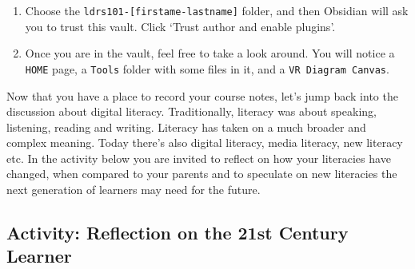 \documentclass[
]{book}
\providecommand{\tightlist}{%
  \setlength{\itemsep}{0pt}\setlength{\parskip}{0pt}}
\theoremstyle{definition}
\theoremstyle{definition}
\theoremstyle{definition}
\theoremstyle{definition}
\theoremstyle{remark}
\begin{document}
\begin{reflect}
\begin{enumerate}
\def\labelenumi{\arabic{enumi}.}
\setcounter{enumi}{5}
\tightlist
\item
  Choose the \texttt{ldrs101-{[}firstame-lastname{]}} folder, and then Obsidian will ask you to trust this vault. Click `Trust author and enable plugins'.
\item
  Once you are in the vault, feel free to take a look around. You will notice a \texttt{HOME} page, a \texttt{Tools} folder with some files in it, and a \texttt{VR\ Diagram\ Canvas}.
\end{enumerate}
\end{reflect}

Now that you have a place to record your course notes, let's jump back into the discussion about digital literacy. Traditionally, literacy was about speaking, listening, reading and writing. Literacy has taken on a much broader and complex meaning. Today there's also digital literacy, media literacy, new literacy etc. In the activity below you are invited to reflect on how your literacies have changed, when compared to your parents and to speculate on new literacies the next generation of learners may need for the future.

\hypertarget{activity-reflection-on-the-21st-century-learner}{%
\subsection*{Activity: Reflection on the 21st Century Learner}\label{activity-reflection-on-the-21st-century-learner}}
\end{document}
